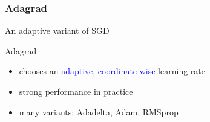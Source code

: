 \documentclass[aspectratio=149]{beamer}
\begin{document}
\begin{frame}
  \frametitle{Adagrad}
  An adaptive variant of SGD
  \begin{algorithm}[H]
    \caption{Adagrad}\label{label:}
    \begin{algorithmic}[1]
      \Endfor
    \end{algorithmic}
  \end{algorithm}
  \begin{itemize}
    \item chooses an \textcolor{blue}{adaptive, coordinate-wise} learning rate
    \item strong performance in practice
    \item many variants: Adadelta, Adam, RMSprop
  \end{itemize}


\end{frame}
\end{document}
